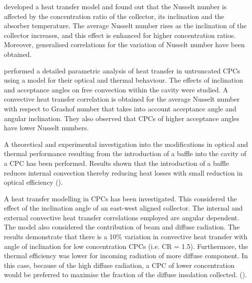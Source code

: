
\citet{Prapas1987} developed a heat transfer model and found out that the Nusselt number is affected by the concentration ratio of the collector, its inclination and the absorber temperature. The average Nusselt number rises as the inclination of the collector increases, and this effect is enhanced for higher concentration ratios. Moreover, generalised correlations for the variation of Nusselt number have been obtained.

\citet{Eames1993} performed a detailed parametric analysis of heat transfer in untruncated CPCs using a model for their optical and thermal behaviour. The effects of inclination and acceptance angles on free convection within the cavity were studied. A convective heat transfer correlation is obtained for the average Nusselt number with respect to Grashof number that takes into account acceptance angle and angular inclination. They also observed that CPCs of higher acceptance angles have lower Nusselt numbers.

A theoretical and experimental investigation into the modifications in optical and thermal
performance resulting from the introduction of a baffle into the cavity of a CPC has been performed. Results shown that the introduction of a baffle reduces internal convection thereby reducing heat losses with small reduction in optical efficiency (\cite{Eames1995}).

A heat transfer modelling in CPCs has been investigated. This considered the effect of the inclination angle of an east-west aligned collector. The internal and external convective heat transfer correlations employed are angular dependent. The model also considered the contribution of beam and diffuse radiation. The results demonstrate that there is a 10\% variation in convective heat transfer with angle of inclination for low concentration CPCs (i.e. CR = 1.5). Furthermore, the thermal efficiency was lower for incoming radiation of more diffuse component. In this case, because of the high diffuse radiation, a CPC of lower concentration would be preferred to maximise the fraction of the diffuse insolation collected. (\cite{Kothdiwala1995}).

